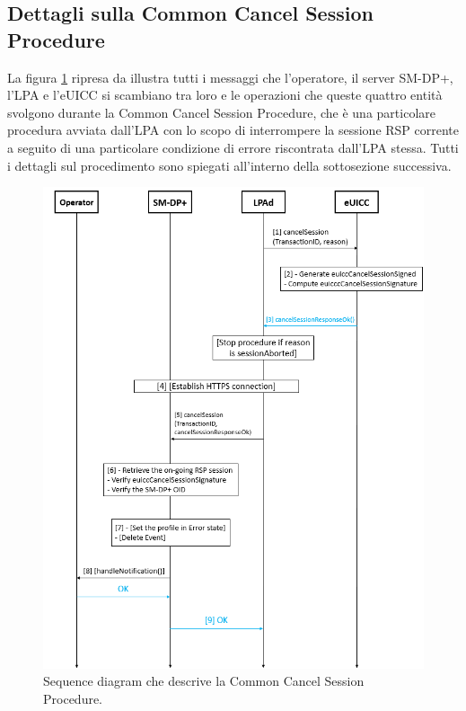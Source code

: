 \documentclass[10pt, oneside]{book}
\begin{document}
\subsection{Dettagli sulla Common Cancel Session Procedure}\label{sec:common-cancel-session}
La figura  \ref{fig:common-cancel-session} ripresa da \cite{GSMA-docs-new} illustra tutti i messaggi che l'operatore, il server SM-DP+, l'LPA e l'eUICC si scambiano tra loro e le operazioni che queste quattro entità svolgono durante la Common Cancel Session Procedure, che è una particolare procedura avviata dall'LPA con lo scopo di interrompere la sessione RSP corrente a seguito di una particolare condizione di errore riscontrata dall'LPA stessa. Tutti i dettagli sul procedimento \cite{GSMA-docs-new} sono spiegati all'interno della sottosezione successiva.
\begin{figure}
\includegraphics[width=\linewidth]{common-cancel-session.png}
\caption{Sequence diagram che descrive la Common Cancel Session Procedure.}
\label{fig:common-cancel-session}
\end{figure}
\end{document}

